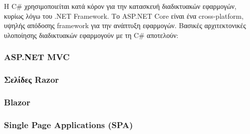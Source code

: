 Η C\# χρησιμοποιείται κατά κόρον για την κατασκευή διαδικτυακών εφαρμογών, κυρίως λόγω του .NET Framework.
Το ASP.NET Core είναι ένα cross-platform, υψηλής απόδοσης framework για την ανάπτυξη εφαρμογών.
Βασικές αρχιτεκτονικές υλοποίησης διαδικτυακών εφαρμογούν με τη C\#  αποτελούν:

\subsubsection*{ASP.NET MVC}


\subsubsection*{Σελίδες Razor}


\subsubsection*{Blazor}


\subsubsection*{Single Page Applications (SPA)}

